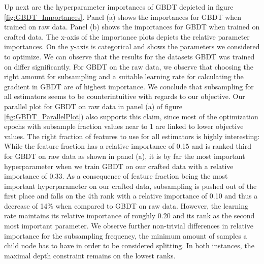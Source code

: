 Up next are the hyperparameter importances of GBDT depicted in figure \ref{fig:GBDT_Importances}. Panel (a) shows the importances for GBDT when trained on raw data. Panel (b) shows the importances for GBDT when trained on crafted data. The x-axis of the importance plots depicts the relative parameter importances. On the y-axis is categorical and shows the parameters we considered to optimize. We can observe that the results for the datasets GBDT was trained on differ significantly. For GBDT on the raw data, we observe that choosing the right amount for subsampling and a suitable learning rate for calculating the gradient in GBDT are of highest importance. We conclude that subsampling for all estimators seems to be counterintuitive with regards to our objective. Our parallel plot for GBDT on raw data in panel (a) of figure \ref{fig:GBDT_ParallelPlot}) also supports this claim, since most of the optimization epochs with subsample fraction values near to 1 are linked to lower objective values.
The right fraction of features to use for all estimators is highly interesting: While the feature fraction has a relative importance of 0.15 and is ranked third for GBDT on raw data as shown in panel (a), it is by far the most important hyperparameter when we train GBDT on our crafted data with a relative importance of 0.33. As a consequence of feature fraction being the most important hyperparameter on our crafted data, subsampling is pushed out of the first place and falls on the 4th rank with a relative importance of 0.10 and thus a decrease of 14\% when compared to GBDT on raw data. However, the learning rate maintains its relative importance of roughly 0.20 and its rank as the second most important parameter. We observe further non-trivial differences in relative importance for the subsampling frequency, the minimum amount of samples a child node has to have in order to be considered splitting. In both instances, the maximal depth constraint remains on the lowest ranks.

